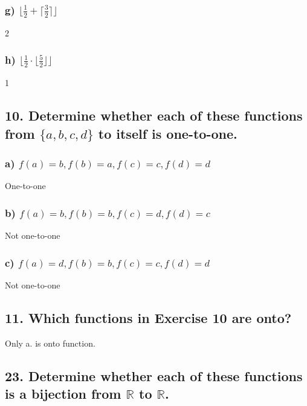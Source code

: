 \documentclass[11pt, oneside]{article} %
\numberwithin{equation}{section} %
\numberwithin{figure}{section} %
\numberwithin{table}{section} %
\begin{document}
\subsubsection{g) $\lfloor \frac{1}{2}+\lceil \frac{3}{2}\rceil\rfloor$}
2
\subsubsection{h) $\lfloor \frac{1}{2}\cdot \lfloor \frac{5}{2}\rfloor\rfloor$}
1


\subsection{10. Determine whether each of these functions from $\{a, b, c, d\}$ to itself is one-to-one.}
\subsubsection{a) $f(a)=b,f(b)=a,f(c)=c,f(d)=d$}
One-to-one
\subsubsection{b) $f(a)=b,f(b)=b,f(c)=d,f(d)=c$}
Not one-to-one
\subsubsection{c) $f(a)=d,f(b)=b,f(c)=c,f(d)=d$}
Not one-to-one

\subsection{11. Which functions in Exercise 10 are onto? }
Only a. is onto function.

\subsection{23. Determine whether each of these functions is a bijection from $\mathbb{R}$ to $\mathbb{R}$.}
\end{document}
